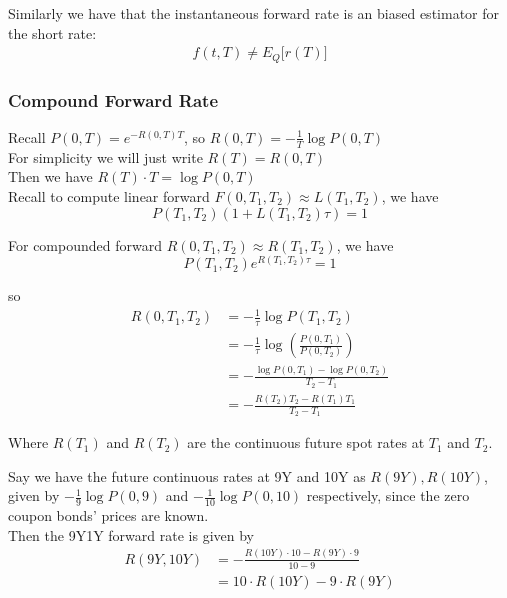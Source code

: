 Similarly we have that the instantaneous forward rate is an 
biased estimator for the short rate:
\begin{align*}
    f(t, T) \neq E_Q\bigl[r(T)\bigr]
\end{align*}

\subsubsection{Compound Forward Rate}

Recall 
$
P(0, T) = e^{-R(0, T) T} 
$,
so
$
R(0, T) = -\frac{1}{T} \log P(0, T)
$ \\
For simplicity we will just write $ R(T) = R(0, T) $\\
Then we have $ R(T) \cdot T = \log P(0, T)$\\
Recall to compute linear forward $ F(0, T_1, T_2) \approx L(T_1, T_2)$, we have
$$
P(T_1, T_2) (1 + L(T_1, T_2) \tau) = 1
$$

For compounded forward $ R(0, T_1, T_2) \approx R(T_1, T_2)$, we have
$$
P(T_1, T_2) e^{R(T_1, T_2) \tau} = 1
$$

so
\begin{align*}
    R(0, T_1, T_2) &= -\frac{1}{\tau} \log P(T_1, T_2) \\
    &= -\frac{1}{\tau} \log \left( \frac{P(0, T_1)}{P(0, T_2)} \right) \\
    &= -\frac{\log P(0, T_1) - \log P(0, T_2)}{T_2 - T_1} \\
    &= -\frac{R(T_2) T_2 - R(T_1) T_1}{T_2 - T_1}
\end{align*}
    
Where $R(T_1)$ and $R(T_2)$ are the continuous future spot rates at $T_1$ and $T_2$.\\

\begin{example}
    Say we have the future continuous rates at 9Y and 10Y as $R(9Y), R(10Y)$,
    given by $ -\frac{1}{9} \log P(0, 9)$ and 
    $ -\frac{1}{10} \log P(0, 10)$ respectively, 
    since the zero coupon bonds' prices are known.\\
    Then the 9Y1Y forward rate is given by
    \begin{align*}
        R(9Y, 10Y) &= -\frac{R(10Y) \cdot 10 - R(9Y) \cdot 9}{10 - 9} \\
        &= 10 \cdot R(10Y) - 9 \cdot R(9Y)
    \end{align*}
\end{example}

